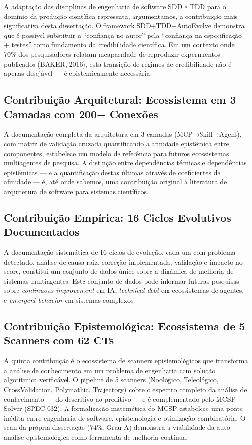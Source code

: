 A adaptação das disciplinas de engenharia de software SDD e TDD para o domínio da produção científica representa, argumentamos, a contribuição mais significativa desta dissertação. O framework SDD+\-TDD+\-Auto\-Evolve demonstra que é possível substituir a ``confiança no autor'' pela ``confiança na especificação + testes'' como fundamento da credibilidade científica. Em um contexto onde 70\% dos pesquisadores relatam incapacidade de reproduzir experimentos publicados (BAKER, 2016), esta transição de regimes de credibilidade não é apenas desejável --- é epistemicamente necessária.

\subsection{Contribuição Arquitetural: Ecossistema em 3 Camadas com 200+ Conexões}

A documentação completa da arquitetura em 3 camadas (MCP→Skill→Agent), com matriz de validação cruzada quantificando a afinidade epistêmica entre componentes, estabelece um modelo de referência para futuros ecossistemas multiagentes de pesquisa. A distinção entre dependências técnicas e dependências epistêmicas --- e a quantificação destas últimas através de coeficientes de afinidade --- é, até onde sabemos, uma contribuição original à literatura de arquitetura de software para sistemas científicos.

\subsection{Contribuição Empírica: 16 Ciclos Evolutivos Documentados}

A documentação sistemática de 16 ciclos de evolução, cada um com problema detectado, análise de causa-raiz, correção implementada, validação e impacto no score, constitui um conjunto de dados único sobre a dinâmica de melhoria de sistemas multiagentes. Este conjunto de dados pode informar futuras pesquisas sobre \textit{continuous improvement} em IA, \textit{technical debt} em ecossistemas de agentes, e \textit{emergent behavior} em sistemas complexos.

\subsection{Contribuição Epistemológica: Ecossistema de 5 Scanners com 62 CTs}

A quinta contribuição é o ecossistema de scanners epistemológicos que transforma a análise de conhecimento em um problema de engenharia com solução algorítmica verificável. O pipeline de 5 scanners (Noológico, Teleológico, CrossValidation, Polymathic, Trajectory) cobre o espectro completo da análise de conhecimento --- do descritivo ao preditivo --- e é complementado pelo MCSP Solver (SPEC-032). A formalização matemática do MCSP estabelece uma ponte inédita entre engenharia de software, epistemologia e otimização combinatória. O scan da própria dissertação (74\%, Grau A) demonstra a viabilidade da auto-análise epistemológica como ferramenta de melhoria contínua.

